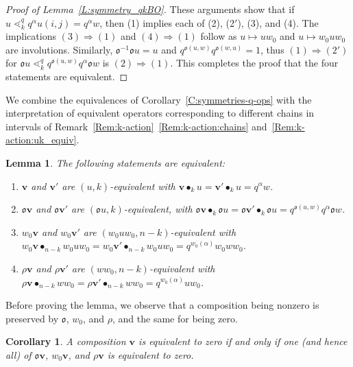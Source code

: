 \documentclass[11pt]{article}
\newtheorem{corollary}[theo]{Corollary}
\newtheorem{lemma}[theo]{Lemma}
\theoremstyle{definition}
\numberwithin{equation}{section}
\newcommand{\qv}{{\mathbf v}}
\DeclareMathOperator{\kactionop}{{\scriptstyle \bullet}}
\newcommand{\kaction}[1][k]{\kactionop_{#1}}
\newcommand{\ncycle}{\mathfrak o}
\begin{document}
\begin{proof}[Proof of Lemma~\ref{L:symmetry_qkBO}]
 These arguments show that if $u\lessdot^q_k q^\alpha u(i,j)=q^\alpha w$, then (1) implies each of (2), (2$'$), (3), and (4).
 The implications  $(3)\Rightarrow(1)$ and $(4)\Rightarrow(1)$ follow as $u\mapsto u w_0$ and  $u\mapsto w_0 u w_0$ are involutions.
 Similarly, $\ncycle^{-1}\ncycle u=u$ and $q^{\ncycle(u,w)}q^{\ncycle(w,u)}=1$, thus $(1)\Rightarrow(2')$
 for $\ncycle u \lessdot^q_k q^{\ncycle(u,w)} q^\alpha\ncycle w$ is $(2)\Rightarrow(1)$.
 This completes the proof that the four statements are equivalent.
\end{proof}

We combine the equivalences of Corollary~\ref{C:symmetries-q-ops} with the interpretation of equivalent operators
corresponding to different chains in intervals of Remark~\ref{Rem:k-action}~\ref{Rem:k-action:chains}
and~\ref{Rem:k-action:uk_equiv}.

\begin{lemma}    \label{lemma:actions}
    The following statements are equivalent:
    \begin{enumerate}[label=(\alph*)]
      
    \item \label{l:actions:a}
      $\qv$ and $\qv'$ are $(u,k)$-equivalent with $\qv \kaction u = \qv' \kaction u = q^\alpha w$.
      
    \item \label{l:actions:b}
      $\ncycle \qv$ and $\ncycle \qv'$ are $(\ncycle u, k)$-equivalent, with
                     $\ncycle\qv\kaction \ncycle u=\ncycle\qv'\kaction \ncycle u = q^{\ncycle(u,w)} q^\alpha \ncycle w$.
    \item \label{l:actions:c}
      $w_0 \qv$ and $w_0\qv'$ are $(w_0uw_0, n{-}k)$-equivalent with
                     $w_0\qv\kactionop_{n-k} w_0uw_0=w_0\qv'\kactionop_{n-k} w_0 uw_0 = q^{w_0(\alpha)} w_0 w w_0$.
    \item \label{l:actions:d}
      $\rho \qv$ and $\rho \qv'$ are $(ww_0, n{-}k)$-equivalent with
                     $\rho\qv\kactionop_{n-k} w w_0=\rho\qv'\kactionop_{n-k} ww_0 = q^{w_0(\alpha)} u w_0$.
    \end{enumerate}
\end{lemma}

Before proving the lemma, we observe
that a composition being nonzero is preserved by $\ncycle$, $w_0$, and $\rho$, and the same for being zero.

\begin{corollary}\label{C:symmetries_bzero}
  A composition $\qv$ is equivalent to zero if and only if one (and hence all) of $\ncycle\qv$, $w_0\qv$, and $\rho\qv$ is equivalent to
  zero. 
\end{corollary}
\end{document}
